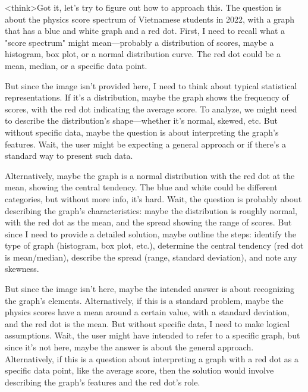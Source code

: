 <think>Got it, let's try to figure out how to approach this. The question is about the physics score spectrum of Vietnamese students in 2022, with a graph that has a blue and white graph and a red dot. First, I need to recall what a "score spectrum" might mean—probably a distribution of scores, maybe a histogram, box plot, or a normal distribution curve. The red dot could be a mean, median, or a specific data point.

But since the image isn't provided here, I need to think about typical statistical representations. If it's a distribution, maybe the graph shows the frequency of scores, with the red dot indicating the average score. To analyze, we might need to describe the distribution's shape—whether it's normal, skewed, etc. But without specific data, maybe the question is about interpreting the graph's features. Wait, the user might be expecting a general approach or if there's a standard way to present such data.

Alternatively, maybe the graph is a normal distribution with the red dot at the mean, showing the central tendency. The blue and white could be different categories, but without more info, it's hard. Wait, the question is probably about describing the graph's characteristics: maybe the distribution is roughly normal, with the red dot as the mean, and the spread showing the range of scores. But since I need to provide a detailed solution, maybe outline the steps: identify the type of graph (histogram, box plot, etc.), determine the central tendency (red dot is mean/median), describe the spread (range, standard deviation), and note any skewness.

But since the image isn't here, maybe the intended answer is about recognizing the graph's elements. Alternatively, if this is a standard problem, maybe the physics scores have a mean around a certain value, with a standard deviation, and the red dot is the mean. But without specific data, I need to make logical assumptions. Wait, the user might have intended to refer to a specific graph, but since it's not here, maybe the answer is about the general approach. Alternatively, if this is a question about interpreting a graph with a red dot as a specific data point, like the average score, then the solution would involve describing the graph's features and the red dot's role.

